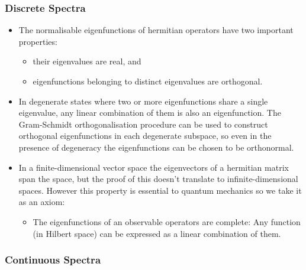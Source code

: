 \documentclass{article}
\begin{document}
\subsubsection{Discrete Spectra}

\begin{itemize}
  \item The normalisable eigenfunctions of hermitian operators have two important properties:

        \begin{itemize}
          \item their eigenvalues are real, and

          \item eigenfunctions belonging to distinct eigenvalues are orthogonal.
        \end{itemize}

  \item In degenerate states where two or more eigenfunctions share a single eigenvalue, any linear combination of them is also an eigenfunction. The Gram-Schmidt orthogonalisation procedure can be used to construct orthogonal eigenfunctions in each degenerate subspace, so even in the presence of degeneracy the eigenfunctions can be chosen to be orthonormal.

  \item In a finite-dimensional vector space the eigenvectors of a hermitian matrix span the space, but the proof of this doesn't translate to infinite-dimensional spaces. However this property is essential to quantum mechanics so we take it as an axiom:

        \begin{itemize}
          \item The eigenfunctions of an observable operators are complete: Any function (in Hilbert space) can be expressed as a linear combination of them.
        \end{itemize}
\end{itemize}

\subsubsection{Continuous Spectra}
\end{document}
